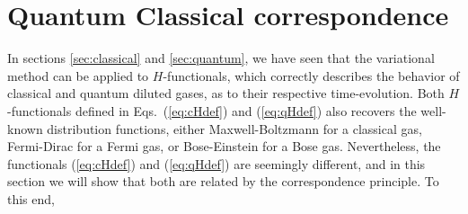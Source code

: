 

\section{Quantum Classical correspondence}\label{sec:qccorrespondence}

In sections \ref{sec:classical} and \ref{sec:quantum}, we have seen that the variational
method can be applied to $H$-functionals, which correctly describes the behavior of
classical and quantum diluted gases, as to their respective time-evolution.
Both $H$-functionals defined in Eqs.~(\ref{eq:cHdef}) and
(\ref{eq:qHdef}) also recovers the well-known distribution functions, either Maxwell-Boltzmann
for a classical gas, Fermi-Dirac for a Fermi gas, or Bose-Einstein for a Bose gas. Nevertheless,
the functionals (\ref{eq:cHdef}) and
(\ref{eq:qHdef}) are seemingly different, and in this section we will show that both are
related by the correspondence principle. To this end, 


\color{blue}


